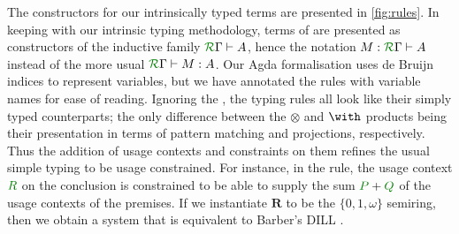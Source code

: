 \documentclass[submission,copyright,creativecommons]{eptcs}
\begin{document}


The constructors for our intrinsically typed terms are presented in \autoref{fig:rules}.
In keeping with our intrinsic typing methodology, terms of \name{} are presented as constructors of the inductive family $\ctx\Gamma{R} \vdash A$, hence the notation $M : \ctx\Gamma{R} \vdash A$ instead of the more usual $\ctx\Gamma{R} \vdash M : A$. 
Our Agda formalisation uses de Bruijn indices to represent variables, but we have annotated the rules with variable names for ease of reading. 
Ignoring the , the typing rules all look like their
simply typed counterparts; the only difference between the $\otimes$
and $\with$ products being their presentation in terms of pattern
matching and projections, respectively.
Thus the addition of usage contexts and constraints on them refines the usual simple typing to be usage constrained.
For instance, in the  rule, the usage context $\rescomment R$ on the conclusion is constrained to be able to supply the sum $\rescomment P + \rescomment Q$ of the usage contexts of the premises.
If we instantiate $\mathbf R$ to be the $\{0, 1, \omega\}$ semiring, then we obtain a system that is equivalent to Barber's DILL \cite{Barber1996}.


\end{document}
